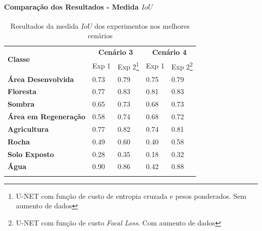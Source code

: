 \documentclass[%
  10pt,%
  aspectratio = 169,%
  compress,%
  t,%
  english,%
  brazilian,%
  tikz,
]{beamer}
\begin{document}
\begin{frame}
    \setcounter{footnote}{0}
    \framesubtitle{Comparação dos Resultados - Medida $IoU$}
    
    \begin{table}[!ht]
        \caption{Resultados da medida $IoU$ dos experimentos nos melhores cenários}%
        \centering
        \begin{tabular}{lllll}
        \toprule
            \multirow{2}{*}{\textbf{Classe}} & \multicolumn{2}{c}{\textbf{Cenário 3}} & \multicolumn{2}{c}{\textbf{Cenário 4}} \\ 
            \cline{2-5} & Exp 1 & Exp 2\footnote{U-NET com função de custo de entropia cruzada e pesos ponderados. Sem aumento de dados} & Exp 1 & Exp 2\footnote{U-NET com função de custo \textit{Focal Loss}. Com aumento de dados} \\
            \midrule
            \textbf{Área Desenvolvida}          & 0.73 & \colorbox{green!25}{0.79} & 0.75 & \colorbox{green!25}{0.79} \\ 
            \textbf{Floresta}                   & 0.77 & \colorbox{green!25}{0.83} & 0.81 & \colorbox{green!25}{0.83} \\ 
            \textbf{Sombra}                     & 0.65 & \colorbox{green!25}{0.73} & 0.68 & \colorbox{green!25}{0.73} \\ 
            \textbf{Área em Regeneração}        & 0.58 & \colorbox{green!25}{0.74} & 0.68 & \colorbox{green!25}{0.72} \\ 
            \textbf{Agricultura}                & 0.77 & \colorbox{green!25}{0.82} & 0.74 & \colorbox{green!25}{0.81} \\ 
            \textbf{Rocha}                      & 0.49 & \colorbox{green!25}{0.60} & 0.40 & \colorbox{green!25}{0.58} \\ 
            \textbf{Solo Exposto}               & 0.28 & \colorbox{green!25}{0.35} & 0.18 & \colorbox{green!25}{0.32} \\ 
            \textbf{Água}                       & \colorbox{green!25}{0.90} & 0.86 & 0.42 & \colorbox{green!25}{0.88} \\ 
            \bottomrule
            \addlinespace
        \end{tabular}
        \label{tab:res:iou:classe}%
    \end{table}
    
\end{frame}
\end{document}
